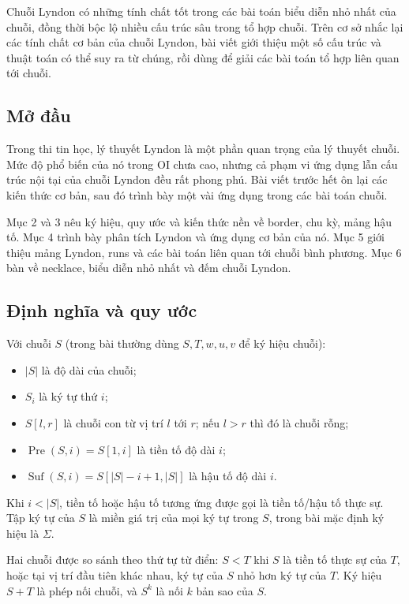 \documentclass[11pt]{article}
\begin{document}
Chuỗi Lyndon có những tính chất tốt trong các bài toán biểu diễn nhỏ nhất của
chuỗi, đồng thời bộc lộ nhiều cấu trúc sâu trong tổ hợp chuỗi. Trên cơ sở nhắc
lại các tính chất cơ bản của chuỗi Lyndon, bài viết giới thiệu một số cấu trúc
và thuật toán có thể suy ra từ chúng, rồi dùng để giải các bài toán tổ hợp liên
quan tới chuỗi.

\subsection{Mở đầu}

Trong thi tin học, lý thuyết Lyndon là một phần quan trọng của lý thuyết chuỗi.
Mức độ phổ biến của nó trong OI chưa cao, nhưng cả phạm vi ứng dụng lẫn cấu trúc
nội tại của chuỗi Lyndon đều rất phong phú. Bài viết trước hết ôn lại các kiến
thức cơ bản, sau đó trình bày một vài ứng dụng trong các bài toán chuỗi.

Mục 2 và 3 nêu ký hiệu, quy ước và kiến thức nền về border, chu kỳ, mảng hậu
tố. Mục 4 trình bày phân tích Lyndon và ứng dụng cơ bản của nó. Mục 5 giới thiệu
mảng Lyndon, runs và các bài toán liên quan tới chuỗi bình phương. Mục 6 bàn về
necklace, biểu diễn nhỏ nhất và đếm chuỗi Lyndon.

\subsection{Định nghĩa và quy ước}

Với chuỗi $S$ (trong bài thường dùng $S,T,w,u,v$ để ký hiệu chuỗi):
\begin{itemize}
  \item $|S|$ là độ dài của chuỗi;
  \item $S_i$ là ký tự thứ $i$;
  \item $S[l,r]$ là chuỗi con từ vị trí $l$ tới $r$; nếu $l>r$ thì đó là chuỗi
  rỗng;
  \item $\operatorname{Pre}(S,i)=S[1,i]$ là tiền tố độ dài $i$;
  \item $\operatorname{Suf}(S,i)=S[|S|-i+1,|S|]$ là hậu tố độ dài $i$.
\end{itemize}
Khi $i<|S|$, tiền tố hoặc hậu tố tương ứng được gọi là tiền tố/hậu tố thực sự.
Tập ký tự của $S$ là miền giá trị của mọi ký tự trong $S$, trong bài mặc định
ký hiệu là $\Sigma$.

Hai chuỗi được so sánh theo thứ tự từ điển: $S<T$ khi $S$ là tiền tố thực sự của
$T$, hoặc tại vị trí đầu tiên khác nhau, ký tự của $S$ nhỏ hơn ký tự của $T$.
Ký hiệu $S+T$ là phép nối chuỗi, và $S^k$ là nối $k$ bản sao của $S$.
\end{document}
